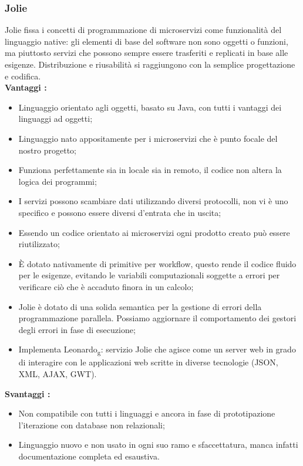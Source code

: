 {		\subsubsection{Jolie}{
			Jolie fissa i concetti di programmazione di microservizi come funzionalità del linguaggio native: gli elementi di base del software non sono oggetti o funzioni, ma piuttosto servizi che possono sempre essere trasferiti e replicati in base alle esigenze. Distribuzione e riusabilità si raggiungono con la semplice progettazione e codifica.\\
			\textbf{Vantaggi :}
			\begin{itemize}\itemsep1pt
				\item Linguaggio orientato agli oggetti, basato su Java, con tutti i vantaggi dei linguaggi ad oggetti;
				\item Linguaggio nato appositamente per i microservizi che è punto focale del nostro progetto;
				\item Funziona perfettamente sia in locale sia in remoto, il codice non altera la logica dei programmi;
				\item I servizi possono scambiare dati utilizzando diversi protocolli, non vi è uno specifico e possono essere diversi d'entrata che in uscita;
				\item Essendo un codice orientato ai microservizi ogni prodotto creato può essere riutilizzato;
				\item È dotato nativamente di primitive per workflow, questo rende il codice fluido per le esigenze, evitando le variabili computazionali soggette a errori per verificare ciò che è accaduto finora in un calcolo;
				\item Jolie è dotato di una solida semantica per la gestione di errori della programmazione parallela. Possiamo  aggiornare il comportamento dei gestori degli errori in fase di esecuzione;
				\item Implementa Leonardo\textsubscript{g}: servizio Jolie che agisce come un server web in grado di interagire con le applicazioni web scritte in diverse tecnologie (JSON, XML, AJAX, GWT). 
			\end{itemize}
			\textbf{Svantaggi :}
			\begin{itemize}\itemsep1pt
				\item Non compatibile con tutti i linguaggi e ancora in fase di prototipazione l'iterazione con database non relazionali;
				\item Linguaggio nuovo e non usato in ogni suo ramo e sfaccettatura, manca infatti documentazione completa ed esaustiva.
			\end{itemize}
		}
}
